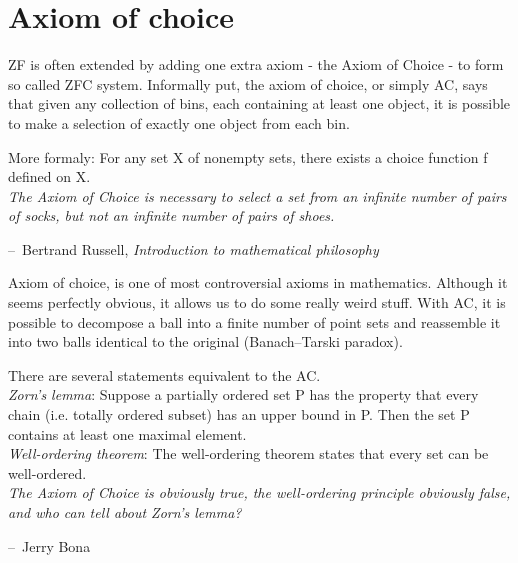 \documentclass[11pt,a5paper]{article}
\makeatletter
\newenvironment{chapquote}[2][2em]
  {\setlength{\@tempdima}{#1}%
   \def\chapquote@author{#2}%
   \parshape 1 \@tempdima \dimexpr\textwidth-2\@tempdima\relax%
   \itshape}
  {\par\normalfont\hfill--\ \chapquote@author\hspace*{\@tempdima}\par\bigskip}
\makeatother
\begin{document}
\section{Axiom of choice}

\noindent ZF is often extended by adding one extra axiom - the Axiom of Choice - to form so called ZFC system. Informally put, the axiom of choice, or simply AC, says that given any collection of bins, each containing at least one object, it is possible to make a selection of exactly one object from each bin.

\noindent More formaly: For any set X of nonempty sets, there exists a choice function f defined on X.
\\

\begin{chapquote}{Bertrand Russell, \textit{Introduction to mathematical philosophy}}
\noindent The Axiom of Choice is necessary to select a set from an infinite number of pairs of socks, but not an infinite number of pairs of shoes.
\end{chapquote}	

\noindent Axiom of choice, is one of most controversial axioms in mathematics. Although it seems perfectly obvious, it allows us to do some really weird stuff. With AC, it is possible to decompose a ball into a finite number of point sets and reassemble it into two balls identical to the original (Banach–Tarski paradox). 

\noindent There are several statements equivalent to the AC. \\

\noindent \emph{Zorn's lemma}: Suppose a partially ordered set P has the property that every chain (i.e. totally ordered subset) has an upper bound in P. Then the set P contains at least one maximal element.\\

\noindent \emph{Well-ordering theorem}: The well-ordering theorem states that every set can be well-ordered.\\

\begin{chapquote}{Jerry Bona}
\noindent The Axiom of Choice is obviously true, the well-ordering principle obviously false, and who can tell about Zorn's lemma?
\end{chapquote}	
\end{document}
